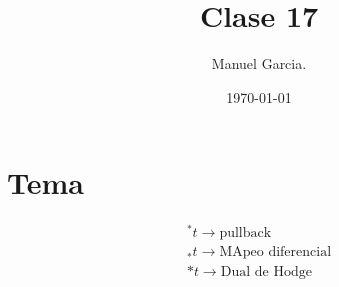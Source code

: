 \documentclass{article}
\title{Clase 17 }
\author{Manuel Garcia.}
\date{\today}
\begin{document}
\maketitle

\section{Tema}
\begin{gather*}
  ^* t \rightarrow \text{pullback }\\
  _* t \rightarrow \text{MApeo diferencial}\\
  * t \rightarrow \text{Dual de Hodge}
\end{gather*}
\end{document}

